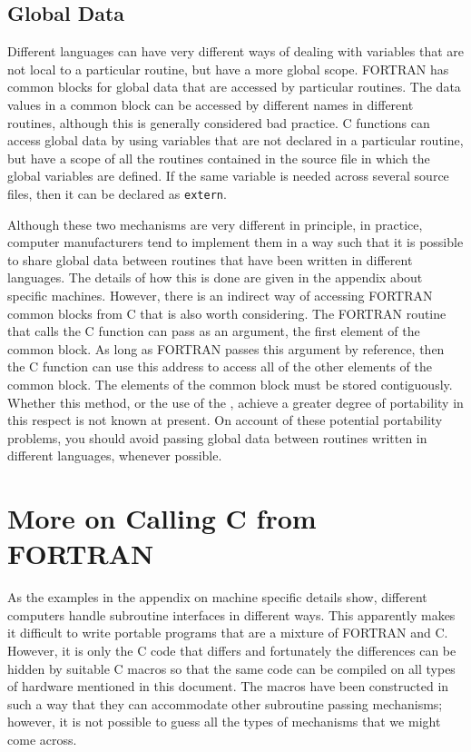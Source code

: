 \documentclass[twoside,11pt,nolof]{starlink}
\newcounter{examples}
\begin{document}
\subsection{Global Data}

Different languages can have very different ways of dealing with variables that
are not local to a particular routine, but have a more global scope. FORTRAN
has common blocks for global data that are accessed by particular routines. The
data values in a common block can be accessed by different names in different
routines, although this is generally considered bad practice. C functions can
access global data by using variables that are not declared in a particular
routine, but have a scope of all the routines contained in the source file in
which the global variables are defined. If the same variable is needed across
several source files, then it can be declared as \texttt{extern}.

Although these two mechanisms are very different in principle, in practice,
computer manufacturers tend to implement them in a way such that it is possible
to share global data between routines that have been written in different
languages. The details of how this is done are given in the appendix about
specific machines. However, there is an indirect way of accessing FORTRAN
common blocks from C that is also worth considering. The FORTRAN routine that
calls the C function can pass as an argument, the first element of the common
block. As long as FORTRAN passes this argument by reference, then the C
function can use this address to access all of the other elements of the common
block. The elements of the common block must be stored contiguously. Whether
this method, or the use of the
,
achieve a greater degree of portability in this respect is not known at
present. On account of these potential portability problems, you should avoid
passing global data between routines written in different languages, whenever
possible.

\section{\label{f77_cfromf}More on
Calling C from FORTRAN}
As the examples in the appendix on machine specific details show, different
computers handle subroutine interfaces in different ways. This apparently makes
it difficult to write portable programs that are a mixture of FORTRAN and C\@.
However, it is only the C code that differs and fortunately the differences can
be hidden by suitable C macros so that the same code can be compiled on all
types of hardware mentioned in this document. The macros have been constructed
in such a way that they can accommodate other subroutine passing mechanisms;
however, it is not possible to guess all the types of mechanisms that we might
come across.
\end{document}
